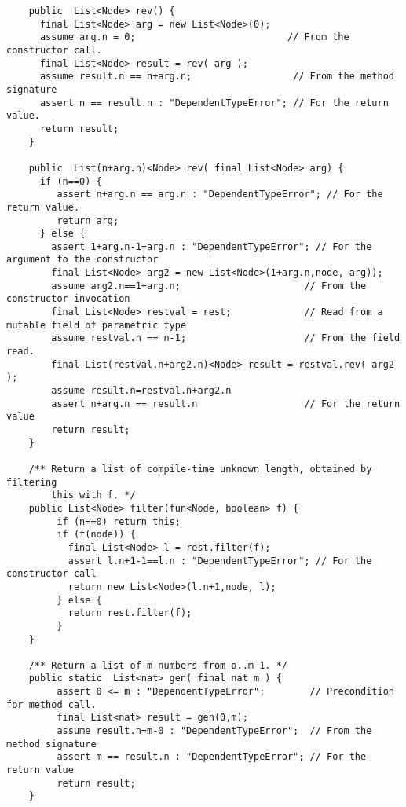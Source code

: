 \begin{figure*}
{\footnotesize
\begin{verbatim}
    public  List<Node> rev() {
      final List<Node> arg = new List<Node>(0);
      assume arg.n = 0;                           // From the constructor call.
      final List<Node> result = rev( arg );
      assume result.n == n+arg.n;                  // From the method signature
      assert n == result.n : "DependentTypeError"; // For the return value.
      return result;
    }

    public  List(n+arg.n)<Node> rev( final List<Node> arg) {
      if (n==0) {
         assert n+arg.n == arg.n : "DependentTypeError"; // For the return value.
         return arg;
      } else {
        assert 1+arg.n-1=arg.n : "DependentTypeError"; // For the argument to the constructor
        final List<Node> arg2 = new List<Node>(1+arg.n,node, arg));
        assume arg2.n==1+arg.n;                      // From the constructor invocation
        final List<Node> restval = rest;             // Read from a mutable field of parametric type
        assume restval.n == n-1;                     // From the field read.
        final List(restval.n+arg2.n)<Node> result = restval.rev( arg2 );
        assume result.n=restval.n+arg2.n
        assert n+arg.n == result.n                   // For the return value
        return result;
    }

    /** Return a list of compile-time unknown length, obtained by filtering
        this with f. */
    public List<Node> filter(fun<Node, boolean> f) {
         if (n==0) return this;
         if (f(node)) {
           final List<Node> l = rest.filter(f);
           assert l.n+1-1==l.n : "DependentTypeError"; // For the constructor call
           return new List<Node>(l.n+1,node, l);
         } else {
           return rest.filter(f);
         }
    }

    /** Return a list of m numbers from o..m-1. */
    public static  List<nat> gen( final nat m ) {
         assert 0 <= m : "DependentTypeError";        // Precondition for method call.
         final List<nat> result = gen(0,m);
         assume result.n=m-0 : "DependentTypeError";  // From the method signature
         assert m == result.n : "DependentTypeError"; // For the return value
         return result;
    }


\end{verbatim}}
\end{figure*}
